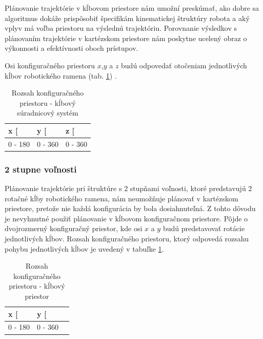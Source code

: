 Plánovanie trajektórie v kĺbovom priestore nám umožní preskúmať, ako dobre sa algoritmus dokáže prispôsobiť špecifikám kinematickej štruktúry robota a aký vplyv má voľba priestoru na výslednú trajektóriu. Porovnanie výsledkov s plánovaním trajektórie v kartézskom priestore nám poskytne ucelený obraz o výkonnosti a efektívnosti oboch prístupov.

Osi konfiguračného priestoru $x$,$y$ a $z$ budú odpovedať otočeniam jednotlivých kĺbov robotického ramena (tab. \ref{table 3.2}) .
\begin{table}[h]
	\centering
	\begin{tabular}{|c|c|c|}
		\hline
		\multicolumn{1}{|l|}{x {[}\degree{]}}  & \multicolumn{1}{l|}{y {[}\degree{]}} & \multicolumn{1}{l|}{z {[}\degree{]}} \\ \hline
		0 - 180                                             & 0 - 360                                             & 0 - 360                              \\ \hline
		
	\end{tabular}
	\caption{Rozsah konfiguračného priestoru - kĺbový súradnicový systém}\label{table 3.2} 
\end{table}



\subsubsection{2 stupne voľnosti}


Plánovanie trajektórie pri štruktúre s 2 stupňami voľnosti, ktoré predstavujú 2 rotačné kĺby robotického ramena, nám neumožňuje plánovať v kartézskom priestore, pretože nie každá konfigurácia by bola dosiahnuteľná. Z tohto dôvodu je nevyhnutné použiť plánovanie v kĺbovom konfiguračnom priestore. Pôjde o dvojrozmerný konfiguračný priestor, kde osi $x$ a $y$ budú predstavovať rotácie jednotlivých kĺbov. Rozsah konfiguračného priestoru, ktorý odpovedá rozsahu pohybu jednotlivých kĺbov je uvedený v tabuľke \ref{table 3.2}.

\begin{table}[h]
	\centering
	\begin{tabular}{|c|c|c|}
		\hline
		\multicolumn{1}{|l|}{x {[}\degree{]}}  & \multicolumn{1}{l|}{y {[}\degree{]}} \\ \hline
		0 - 180                                             & 0 - 360       \\ \hline
		
	\end{tabular}
	\caption{Rozsah konfiguračného priestoru - kĺbový priestor}\label{table 3.3} 
\end{table}




